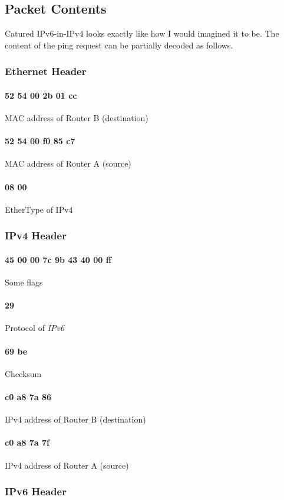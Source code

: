 \documentclass[a4paper,12pt]{article}
\begin{document}
\subsection{Packet Contents}
Catured IPv6-in-IPv4 looks exactly like how I would imagined it to be.
The content of the ping request can be partially decoded as follows.

\subsubsection{Ethernet Header}
\paragraph{52 54 00 2b 01 cc} MAC address of Router B (destination)
\paragraph{52 54 00 f0 85 c7} MAC address of Router A (source)
\paragraph{08 00} EtherType of IPv4

\subsubsection{IPv4 Header}
\paragraph{45 00 00 7c 9b 43 40 00 ff} Some flags
\paragraph{29} Protocol of \emph{IPv6}
\paragraph{69 be} Checksum
\paragraph{c0 a8 7a 86} IPv4 address of Router B (destination)
\paragraph{c0 a8 7a 7f} IPv4 address of Router A (source)

\subsubsection{IPv6 Header}
\end{document}
